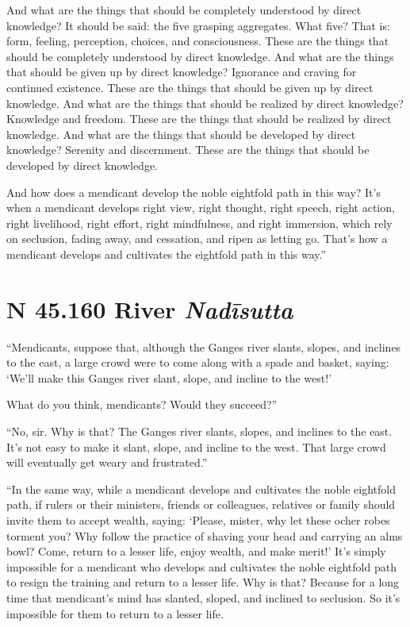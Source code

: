 \documentclass[12pt,openany]{book}%
\newcommand*{\suttatitleacronym}[1]{\smaller[2]{#1}\vspace*{.3em}}
\newcommand*{\suttatitletranslation}[1]{\linebreak{#1}}
\newcommand*{\suttatitleroot}[1]{\linebreak\smaller[2]\itshape{#1}}
\newcommand*{\tocacronym}[1]{\hspace*{-3.3em}{#1}\quad}
\newcommand*{\toctranslation}[1]{#1}
\newcommand*{\tocroot}[1]{(\textit{#1})}
\begin{document}
And what are the things that should be completely understood by direct knowledge? It should be said: the five grasping aggregates. What five? That is: form, feeling, perception, choices, and consciousness. These are the things that should be completely understood by direct knowledge. And what are the things that should be given up by direct knowledge? Ignorance and craving for continued existence. These are the things that should be given up by direct knowledge. And what are the things that should be realized by direct knowledge? Knowledge and freedom. These are the things that should be realized by direct knowledge. And what are the things that should be developed by direct knowledge? Serenity and discernment. These are the things that should be developed by direct knowledge. 

And how does a mendicant develop the noble eightfold path in this way? It’s when a mendicant develops right view, right thought, right speech, right action, right livelihood, right effort, right mindfulness, and right immersion, which rely on seclusion, fading away, and cessation, and ripen as letting go. That’s how a mendicant develops and cultivates the eightfold path in this way.” 

%
\section*{{\suttatitleacronym SN 45.160}{\suttatitletranslation A River }{\suttatitleroot Nadīsutta}}
\addcontentsline{toc}{section}{\tocacronym{SN 45.160} \toctranslation{A River } \tocroot{Nadīsutta}}

“Mendicants, suppose that, although the Ganges river slants, slopes, and inclines to the east, a large crowd were to come along with a spade and basket, saying: ‘We’ll make this Ganges river slant, slope, and incline to the west!’ 

What do you think, mendicants? Would they succeed?” 

“No, sir. Why is that? The Ganges river slants, slopes, and inclines to the east. It’s not easy to make it slant, slope, and incline to the west. That large crowd will eventually get weary and frustrated.” 

“In the same way, while a mendicant develops and cultivates the noble eightfold path, if rulers or their ministers, friends or colleagues, relatives or family should invite them to accept wealth, saying: ‘Please, mister, why let these ocher robes torment you? Why follow the practice of shaving your head and carrying an alms bowl? Come, return to a lesser life, enjoy wealth, and make merit!’ It’s simply impossible for a mendicant who develops and cultivates the noble eightfold path to resign the training and return to a lesser life. Why is that? Because for a long time that mendicant’s mind has slanted, sloped, and inclined to seclusion. So it’s impossible for them to return to a lesser life. 
\end{document}
